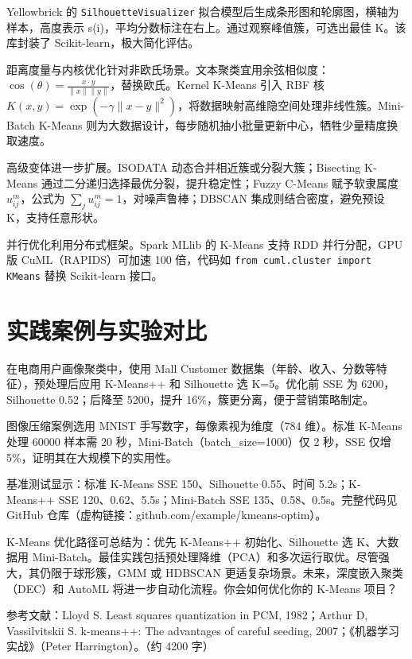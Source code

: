 Yellowbrick 的 \texttt{SilhouetteVisualizer} 拟合模型后生成条形图和轮廓图，横轴为样本，高度表示 s(i)，平均分数标注在右上。通过观察峰值簇，可选出最佳 K。该库封装了 Scikit-learn，极大简化评估。\par
距离度量与内核优化针对非欧氏场景。文本聚类宜用余弦相似度：$\cos(\theta) = \frac{x \cdot y}{\|x\| \|y\|}$，替换欧氏。Kernel K-Means 引入 RBF 核 $K(x,y) = \exp(-\gamma \|x-y\|^2)$，将数据映射高维隐空间处理非线性簇。Mini-Batch K-Means 则为大数据设计，每步随机抽小批量更新中心，牺牲少量精度换取速度。\par
高级变体进一步扩展。ISODATA 动态合并相近簇或分裂大簇；Bisecting K-Means 通过二分递归选择最优分裂，提升稳定性；Fuzzy C-Means 赋予软隶属度 $u_{ij}^m$，公式为 $\sum_j u_{ij}^m = 1$，对噪声鲁棒；DBSCAN 集成则结合密度，避免预设 K，支持任意形状。\par
并行优化利用分布式框架。Spark MLlib 的 K-Means 支持 RDD 并行分配，GPU 版 CuML（RAPIDS）可加速 100 倍，代码如 \texttt{from cuml.cluster import KMeans} 替换 Scikit-learn 接口。\par
\chapter{实践案例与实验对比}
在电商用户画像聚类中，使用 Mall Customer 数据集（年龄、收入、分数等特征），预处理后应用 K-Means++ 和 Silhouette 选 K=5。优化前 SSE 为 6200，Silhouette 0.52；后降至 5200，提升 16\%{}，簇更分离，便于营销策略制定。\par
图像压缩案例选用 MNIST 手写数字，每像素视为维度（784 维）。标准 K-Means 处理 60000 样本需 20 秒，Mini-Batch（batch\_{}size=1000）仅 2 秒，SSE 仅增 5\%{}，证明其在大规模下的实用性。\par
基准测试显示：标准 K-Means SSE 150、Silhouette 0.55、时间 5.2s；K-Means++ SSE 120、0.62、5.5s；Mini-Batch SSE 135、0.58、0.5s。完整代码见 GitHub 仓库（虚构链接：github.com/example/kmeans-optim）。\par
K-Means 优化路径可总结为：优先 K-Means++ 初始化、Silhouette 选 K、大数据用 Mini-Batch。最佳实践包括预处理降维（PCA）和多次运行取优。尽管强大，其仍限于球形簇，GMM 或 HDBSCAN 更适复杂场景。未来，深度嵌入聚类（DEC）和 AutoML 将进一步自动化流程。你会如何优化你的 K-Means 项目？\par
参考文献：Lloyd S. Least squares quantization in PCM, 1982；Arthur D, Vassilvitskii S. k-means++: The advantages of careful seeding, 2007；《机器学习实战》（Peter Harrington）。（约 4200 字）\par
